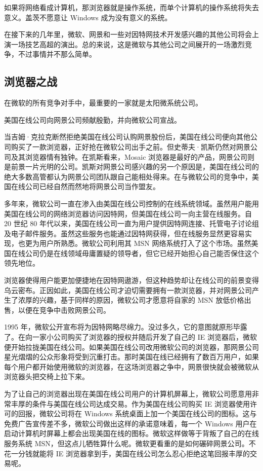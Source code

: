 \documentclass[12pt,UTF8]{ctexbook}
\begin{document}
如果将网络看成计算机，那浏览器就是操作系统，而单个计算机的操作系统将失去意义。盖茨不愿意让 Windows 成为没有意义的系统。

在接下来的几年里，微软、网景和一些对因特网技术开发感兴趣的其他公司将会上演一场技艺高超的演出。总的来说，这是微软与其他公司之间展开的一场激烈竞争，不过事情并不那么简单。





\subsection{浏览器之战}


在微软的所有竞争对手中，最重要的一家就是太阳微系统公司。

美国在线公司向网景公司频献殷勤，并向微软公司宣战。

当吉姆·克拉克断然拒绝美国在线公司认购网景股份后，美国在线公司便向其他公司购买了一款浏览器，正好抢在微软公司出手之前。但史蒂夫·凯斯仍然对网景公司及其浏览器情有独钟。在凯斯看来，Mosaic 浏览器是最好的产品，网景公司则是前景一片光明的公司。凯斯对网景公司感兴趣的另一个原因是，美国在线公司的绝大多数高管都认为网景公司团队跟自己能相处得来。在与微软公司的竞争中，美国在线公司已经自然而然地将网景公司当作盟友。

多年来，微软公司一直在渗入由美国在线公司控制的在线系统领域。虽然用户能用美国在线公司的网络浏览器访问因特网，但美国在线公司一向主营在线服务。自 20 世纪 80 年代以来，美国在线公司一直为用户提供因特网连接、托管电子讨论组及电子邮件服务。虽然这些服务也能通过因特网获得，但在线服务显然更容易实现，也更为用户所熟悉。微软公司利用其 MSN 网络系统打入了这个市场。虽然美国在线公司仍是在线领域毋庸置疑的领导者，但它已经开始担心自己能否保住这个领先地位。

浏览器使得用户能更加便捷地在因特网遨游，但这种趋势却让在线公司的前景变得乌云密布。正因如此，美国在线公司才迫切需要拥有一款浏览器，并对网景公司产生了浓厚的兴趣，基于同样的原因，微软公司才愿意将自家的 MSN 放低价格出售，以便在竞争中击败网景公司。

1995 年，微软公开宣布将为因特网略尽绵力。没过多久，它的意图就原形毕露了。在向一家小公司购买了浏览器的授权并随后开发了自己的 IE 浏览器后，微软便开始拉拢美国在线公司。如果美国在线公司改用微软公司的浏览器，那网景公司星光熠熠的公众形象将受到沉重打击。那时美国在线已经拥有了数百万用户，如果每个用户都开始使用微软的浏览器，在这场浏览器之争中，网景很快就会被微软从浏览器头把交椅上拉下来。

为了让自己的浏览器出现在美国在线公司用户的计算机屏幕上，微软公司愿意用非常丰厚的条件与美国在线公司达成交易。作为美国在线公司购买 IE 浏览器使用许可的回报，微软公司将在 Windows 系统桌面上加一个美国在线公司的图标。这与免费广告宣传差不多，微软公司做出这样的承诺意味着，每一个 Windows 用户在启动计算机时屏幕上都会出现美国在线的图标。微软这样做等于背叛了自己的在线服务系统 MSN，但这点儿牺牲算什么呢。微软更看重的是如何碾碎网景公司。不花一分钱就能将 IE 浏览器拿到手，美国在线公司怎么忍心拒绝这笔回报丰厚的交易呢。
\end{document}
